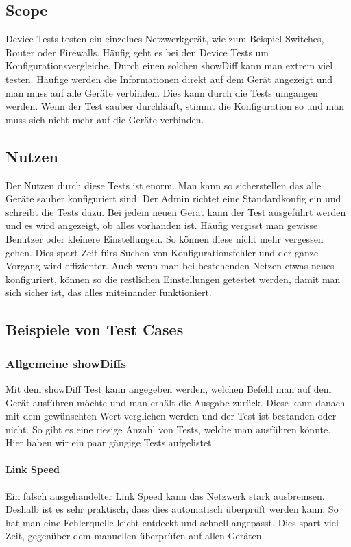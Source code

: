 \documentclass[a4,12pt]{scrartcl}
\begin{document}
\subsection{Scope}
Device Tests testen ein einzelnes Netzwerkgerät, wie zum Beispiel Switches, Router oder Firewalls. Häufig geht es bei den Device Tests um Konfigurationsvergleiche. Durch einen solchen showDiff kann man extrem viel testen.\newline\newline
Häufige werden die Informationen direkt auf dem Gerät angezeigt und man muss auf alle Geräte verbinden. Dies kann durch die Tests umgangen werden. Wenn der Test sauber durchläuft, stimmt die Konfiguration so und man muss sich nicht mehr auf die Geräte verbinden.
\subsection{Nutzen}
Der Nutzen durch diese Tests ist enorm. Man kann so sicherstellen das alle Geräte sauber konfiguriert sind. Der Admin richtet eine Standardkonfig ein und schreibt die Tests dazu. Bei jedem neuen Gerät kann der Test ausgeführt werden und es wird angezeigt, ob alles vorhanden ist. Häufig vergisst man gewisse Benutzer oder kleinere Einstellungen. So können diese nicht mehr vergessen gehen.\newline\newline
Dies spart Zeit fürs Suchen von Konfigurationsfehler und der ganze Vorgang wird effizienter. Auch wenn man bei bestehenden Netzen etwas neues konfiguriert, können so die restlichen Einstellungen getestet werden, damit man sich sicher ist, das alles miteinander funktioniert.
\subsection{Beispiele von Test Cases}
\subsubsection{Allgemeine showDiffs}
Mit dem showDiff Test kann angegeben werden, welchen Befehl man auf dem Gerät ausführen möchte und man erhält die Ausgabe zurück. Diese kann danach mit dem gewünschten Wert verglichen werden und der Test ist bestanden oder nicht.
So gibt es eine riesige Anzahl von Tests, welche man ausführen könnte. Hier haben wir ein paar gängige Tests aufgelistet.
\paragraph{Link Speed}\newline
Ein falsch ausgehandelter Link Speed kann das Netzwerk stark ausbremsen. Deshalb ist es sehr praktisch, dass dies automatisch überprüft werden kann. So hat man eine Fehlerquelle leicht entdeckt und schnell angepasst. Dies spart viel Zeit, gegenüber dem manuellen überprüfen auf allen Geräten.
\end{document}
